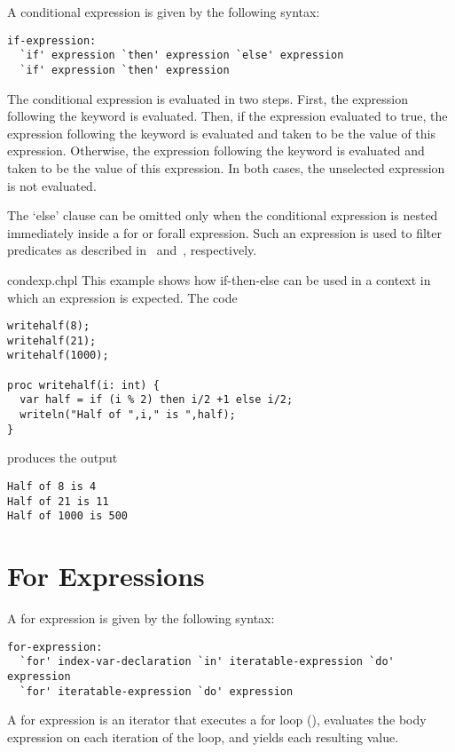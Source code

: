 A conditional expression is given by the following syntax:
\begin{syntax}
\begin{verbatim}
if-expression:
  `if' expression `then' expression `else' expression
  `if' expression `then' expression
\end{verbatim}
\end{syntax}
The conditional expression is evaluated in two steps.  First, the
expression following the  keyword is evaluated.  Then, if the
expression evaluated to true, the expression following the 
keyword is evaluated and taken to be the value of this expression.
Otherwise, the expression following the  keyword is
evaluated and taken to be the value of this expression.  In both
cases, the unselected expression is not evaluated.

The `else' clause can be omitted only when the conditional expression
is nested immediately inside a for or forall expression.  Such an expression
is used to filter predicates as described
in~ and~,
respectively.

\begin{chapelexample}{condexp.chpl}
This example shows how if-then-else can be used in a context in which an
expression is expected.  The code
\begin{chapel}
\begin{verbatim}
writehalf(8);
writehalf(21);
writehalf(1000);

proc writehalf(i: int) {
  var half = if (i % 2) then i/2 +1 else i/2;
  writeln("Half of ",i," is ",half); 
}
\end{verbatim}
\end{chapel}
produces the output
\begin{chapelprintoutput}
\begin{verbatim}
Half of 8 is 4
Half of 21 is 11
Half of 1000 is 500
\end{verbatim}
\end{chapelprintoutput}
\end{chapelexample}

\section{For Expressions}
\label{For_Expressions}

A for expression is given by the following syntax:
\begin{syntax}
\begin{verbatim}
for-expression:
  `for' index-var-declaration `in' iteratable-expression `do' expression
  `for' iteratable-expression `do' expression
\end{verbatim}
\end{syntax}
A for expression is an iterator that executes a for loop (),
evaluates the body expression on each iteration of the loop,
and yields each resulting value.

